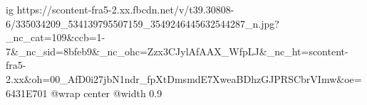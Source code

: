  
 
 
 
 

\ifcmt
  ig https://scontent-fra5-2.xx.fbcdn.net/v/t39.30808-6/335034209_534139795507159_3549246445632544287_n.jpg?_nc_cat=109&ccb=1-7&_nc_sid=8bfeb9&_nc_ohc=Zzx3CJylAfAAX_WfpLJ&_nc_ht=scontent-fra5-2.xx&oh=00_AfD0i27jbN1ndr_fpXtDmsmdE7XweaBDhzGJPRSCbrVImw&oe=6431E701
  @wrap center
  @width 0.9
\fi


